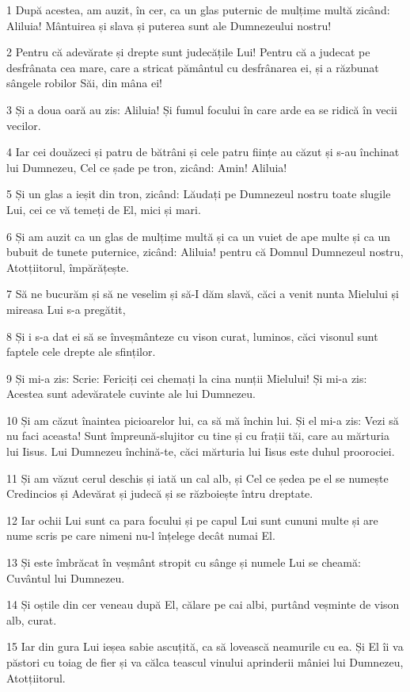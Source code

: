 \par 1 După acestea, am auzit, în cer, ca un glas puternic de mulțime multă zicând: Aliluia! Mântuirea și slava și puterea sunt ale Dumnezeului nostru!
\par 2 Pentru că adevărate și drepte sunt judecățile Lui! Pentru că a judecat pe desfrânata cea mare, care a stricat pământul cu desfrânarea ei, și a răzbunat sângele robilor Săi, din mâna ei!
\par 3 Și a doua oară au zis: Aliluia! Și fumul focului în care arde ea se ridică în vecii vecilor.
\par 4 Iar cei douăzeci și patru de bătrâni și cele patru ființe au căzut și s-au închinat lui Dumnezeu, Cel ce șade pe tron, zicând: Amin! Aliluia!
\par 5 Și un glas a ieșit din tron, zicând: Lăudați pe Dumnezeul nostru toate slugile Lui, cei ce vă temeți de El, mici și mari.
\par 6 Și am auzit ca un glas de mulțime multă și ca un vuiet de ape multe și ca un bubuit de tunete puternice, zicând: Aliluia! pentru că Domnul Dumnezeul nostru, Atotțiitorul, împărățește.
\par 7 Să ne bucurăm și să ne veselim și să-I dăm slavă, căci a venit nunta Mielului și mireasa Lui s-a pregătit,
\par 8 Și i s-a dat ei să se înveșmânteze cu vison curat, luminos, căci visonul sunt faptele cele drepte ale sfinților.
\par 9 Și mi-a zis: Scrie: Fericiți cei chemați la cina nunții Mielului! Și mi-a zis: Acestea sunt adevăratele cuvinte ale lui Dumnezeu.
\par 10 Și am căzut înaintea picioarelor lui, ca să mă închin lui. Și el mi-a zis: Vezi să nu faci aceasta! Sunt împreună-slujitor cu tine și cu frații tăi, care au mărturia lui Iisus. Lui Dumnezeu închină-te, căci mărturia lui Iisus este duhul proorociei.
\par 11 Și am văzut cerul deschis și iată un cal alb, și Cel ce ședea pe el se numește Credincios și Adevărat și judecă și se războiește întru dreptate.
\par 12 Iar ochii Lui sunt ca para focului și pe capul Lui sunt cununi multe și are nume scris pe care nimeni nu-l înțelege decât numai El.
\par 13 Și este îmbrăcat în veșmânt stropit cu sânge și numele Lui se cheamă: Cuvântul lui Dumnezeu.
\par 14 Și oștile din cer veneau după El, călare pe cai albi, purtând veșminte de vison alb, curat.
\par 15 Iar din gura Lui ieșea sabie ascuțită, ca să lovească neamurile cu ea. Și El îi va păstori cu toiag de fier și va călca teascul vinului aprinderii mâniei lui Dumnezeu, Atotțiitorul.
